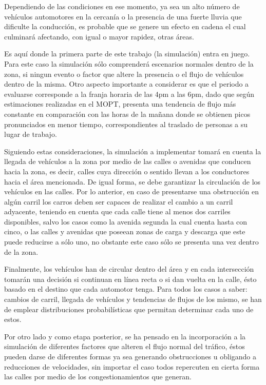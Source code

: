 \documentclass[12pt,journal,compsoc]{IEEEtran}
\begin{document}
	Dependiendo de las condiciones en ese momento, ya sea un alto n\'{u}mero de
	veh\'{i}culos automotores en la cercan\'{i}a o la presencia de una fuerte lluvia que
	dificulte la conducci\'{o}n, es probable que se genere un efecto en cadena el cual
	culminar\'{a} afectando, con igual o mayor rapidez, otras \'{a}reas.

	Es aqu\'{i} donde la primera parte de este trabajo (la simulaci\'{o}n) entra en juego. Para este caso la simulaci\'{o}n s\'{o}lo comprender\'{a} escenarios normales dentro de la zona, si ningun evento o factor que altere la presencia o el flujo de veh\'{i}culos dentro de la misma. Otro aspecto importante a considerar es que el periodo a evaluarse corresponde a la franja horaria de las 4pm a las 6pm, dado que seg\'{u}n estimaciones realizadas en el MOPT, presenta una tendencia de flujo m\'{a}s constante en comparaci\'{o}n con las horas de la ma\~{n}ana donde se obtienen picos pronunciados en menor tiempo, correspondientes al traslado de personas a su lugar de trabajo.
	
	Siguiendo estas consideraciones, la simulaci\'{o}n a implementar tomar\'{a} en cuenta la llegada de veh\'{i}culos a la zona por medio de las calles o avenidas que conducen hacia la zona, es decir, calles cuya direcci\'{o}n o sentido llevan a los conductores hacia el \'{a}rea mencionada. De igual forma, se debe garantizar la circulaci\'{o}n de los veh\'{i}culos en las calles. Por lo anterior, en caso de presentarse una obstrucci\'{o}n en alg\'{u}n carril los carros deben ser capaces de realizar el cambio a un carril adyacente, teniendo en cuenta que cada calle tiene al menos dos carriles disponibles, salvo los casos como la avenida segunda la cual cuenta hasta con cinco, o las calles y avenidas que poseean zonas de carga y descarga que este puede reducirse a s\'{o}lo uno, no obstante este caso s\'{o}lo se presenta una vez dentro de la zona.

	Finalmente, los veh\'{i}culos han de circular dentro del \'{a}rea y en cada intersecci\'{o}n tomar\'{a}n una decisi\'{o}n si continuan en l\'{i}nea recta o si dan vuelta en la calle, \'{e}sto basado en el destino que cada automotor tenga. Para todos los casos a saber: cambios de carril, llegada de veh\'{i}culos y tendencias de flujos de los mismo, se han de emplear distribuciones probabil\'{i}sticas que permitan determinar cada uno de estos.
	
	Por otro lado y como etapa posterior, se ha pensado en la incorporaci\'{o}n a la simulaci\'{o}n de diferentes factores que alteren el flujo normal del tr\'{a}fico, \'{e}stos pueden darse de diferentes formas ya sea generando obstrucciones u obligando a reducciones de velocidades, sin importar el caso todos repercuten en cierta forma las calles por medio de los congestionamientos que generan.
	
\end{document}
